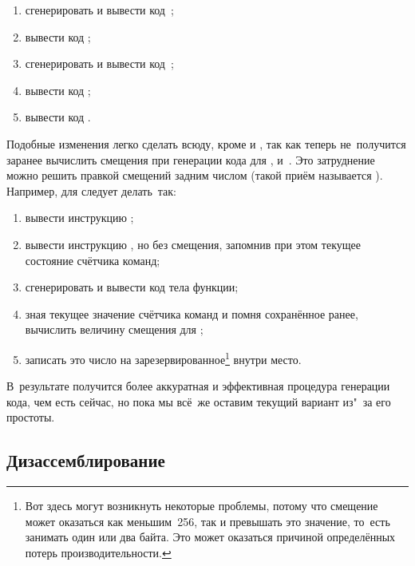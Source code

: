 \begin{enumerate}
  \item сгенерировать и вывести код~;
  \item вывести код ;
  \item сгенерировать и вывести код~;
  \item вывести код ;
  \item вывести код .
\end{enumerate}

Подобные изменения легко сделать всюду, кроме  и , так
как теперь не~получится заранее вычислить смещения при генерации кода для
,  и~. Это затруднение
можно решить правкой смещений задним числом (такой приём называется
). Например, для  следует делать~так:

\begin{enumerate}
  \item вывести инструкцию ;
  
  \item вывести инструкцию , но без смещения, запомнив при этом
        текущее состояние счётчика команд;
  
  \item сгенерировать и вывести код тела функции;
  
  \item зная текущее значение счётчика команд и помня сохранённое ранее,
        вычислить величину смещения для ;
  
  \item записать это число на зарезервированное\footnote{Вот здесь могут
        возникнуть некоторые проблемы, потому что смещение может оказаться
        как меньшим~256, так и превышать это значение, то~есть занимать
        один или два байта. Это может оказаться причиной определённых
        потерь производительности.} внутри  место.
\end{enumerate}

В~результате получится более аккуратная и эффективная процедура генерации кода,
чем есть сейчас, но пока мы всё~же оставим текущий вариант из"~за его простоты.


\subsection{Дизассемблирование}%
\label{compilation/lang-and-target/ssect:disassembly}

